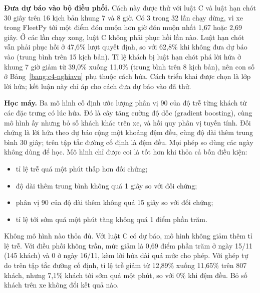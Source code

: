 \textbf{Đưa dự báo vào bộ điều phối.} Cách này được thử với luật C và luật hạn chót 30 giây trên 16 kịch bản khung 7
và 8 giờ. Có 3 trong 32 lần chạy dừng, vì xe trong FleetPy tới một điểm đón muộn hơn giờ đón muộn nhất 1,67 hoặc
2,69 giây. Ở các lần chạy xong, luật C không phải phục hồi lần nào. Luật hạn chót vẫn phải phục hồi ở 47,6\% lượt
quyết định, so với 62,8\% khi không đưa dự báo vào (trung bình trên 15 kịch bản). Tỉ lệ khách bị luật hạn chót phá
lời hứa ở khung 7 giờ giảm từ 39,0\% xuống 11,0\% (trung bình trên 8 kịch bản), nên con số ở
Bảng~\ref{bang:c4-nghiavu} phụ thuộc cách hứa. Cách triển khai được chọn là lớp lời hứa; kết luận này chỉ áp cho cách
đưa dự báo vào đã thử.

\textbf{Học máy.} Ba mô hình cố định ước lượng phân vị 90 của độ trễ từng khách từ các đặc trưng có lúc hứa. Đó là
cây tăng cường độ dốc (gradient boosting), cùng mô hình ấy nhưng bỏ số khách khác trên xe, và hồi quy phân vị tuyến
tính. Đối chứng là lời hứa theo dự báo cộng một khoảng đệm đều, cùng độ dài thêm trung bình 30 giây; trên tập tắc
đường cố định là đệm đều. Mọi phép so dùng các ngày không dùng để học. Mô hình chỉ được coi là tốt hơn khi thỏa cả bốn
điều kiện:
\begin{itemize}[leftmargin=1.2cm,itemsep=0pt,topsep=2pt]
\item tỉ lệ trễ quá một phút thấp hơn đối chứng;
\item độ dài thêm trung bình không quá 1 giây so với đối chứng;
\item phân vị 90 của độ dài thêm không quá 15 giây so với đối chứng;
\item tỉ lệ tới sớm quá một phút tăng không quá 1 điểm phần trăm.
\end{itemize}

Không mô hình nào thỏa đủ. Với luật C có dự báo, mô hình không giảm thêm tỉ lệ trễ. Với điều phối không trần, mức
giảm là 0,69 điểm phần trăm ở ngày 15/11 (145 khách) và 0 ở ngày 16/11, kèm lời hứa dài quá mức cho phép. Với ghép
tự do trên tập tắc đường cố định, tỉ lệ trễ giảm từ 12,89\% xuống 11,65\% trên 807 khách, nhưng 7,1\% khách tới sớm
quá một phút, so với 0\% khi đệm đều. Bỏ số khách trên xe không đổi kết quả nào.

